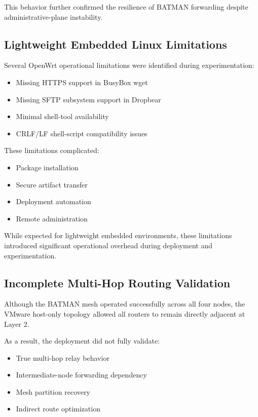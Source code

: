 \documentclass[conference]{IEEEtran}
\begin{document}
This behavior further confirmed the resilience of BATMAN forwarding despite administrative-plane instability.

\subsection{Lightweight Embedded Linux Limitations}

Several OpenWrt operational limitations were identified during experimentation:

\begin{itemize}
    \item Missing HTTPS support in BusyBox wget
    \item Missing SFTP subsystem support in Dropbear
    \item Minimal shell-tool availability
    \item CRLF/LF shell-script compatibility issues
\end{itemize}

These limitations complicated:
\begin{itemize}
    \item Package installation
    \item Secure artifact transfer
    \item Deployment automation
    \item Remote administration
\end{itemize}

While expected for lightweight embedded environments, these limitations introduced significant operational overhead during deployment and experimentation.

\subsection{Incomplete Multi-Hop Routing Validation}

Although the BATMAN mesh operated successfully across all four nodes, the VMware host-only topology allowed all routers to remain directly adjacent at Layer 2.

As a result, the deployment did not fully validate:

\begin{itemize}
    \item True multi-hop relay behavior
    \item Intermediate-node forwarding dependency
    \item Mesh partition recovery
    \item Indirect route optimization
\end{itemize}
\end{document}
